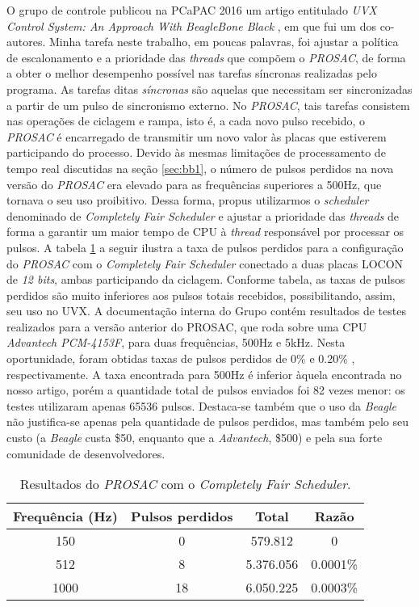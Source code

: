 O grupo de controle publicou na PCaPAC 2016 um artigo entitulado \textit{UVX
Control System: An Approach With BeagleBone Black} \cite{pcapac2016}, em que fui
um dos co-autores. Minha tarefa neste trabalho, em poucas palavras, foi ajustar
a política de escalonamento e a prioridade das \textit{threads} que compõem o
\textit{PROSAC}, de forma a obter o melhor desempenho possível nas tarefas
síncronas realizadas pelo programa. As tarefas ditas \textit{síncronas}
são aquelas que necessitam ser sincronizadas a partir de um pulso de sincronismo
externo. No \textit{PROSAC}, tais tarefas consistem nas operações de ciclagem e
rampa, isto é, a cada novo pulso recebido, o \textit{PROSAC} é encarregado de
transmitir um novo valor às placas que estiverem participando do processo.
Devido às mesmas limitações de processamento de tempo real discutidas na seção
\ref{sec:bb1}, o número de pulsos perdidos na nova versão do \textit{PROSAC} era
elevado para as frequências superiores a 500Hz, que tornava o seu uso
proibitivo. Dessa forma, propus utilizarmos o \textit{scheduler} denominado de
\textit{Completely Fair Scheduler} e ajustar a prioridade das \textit{threads}
de forma a garantir um maior tempo de CPU à \textit{thread} responsável por
processar os pulsos. A tabela \ref{tab:prosac} a seguir ilustra a taxa de pulsos
perdidos para a configuração do \textit{PROSAC} com o \textit{Completely Fair
Scheduler} conectado a duas placas LOCON de \textit{12 bits}, ambas
participando da ciclagem. Conforme tabela, as taxas de pulsos perdidos são muito
inferiores aos pulsos totais recebidos, possibilitando, assim, seu uso no UVX.
A documentação interna do Grupo contém resultados de testes realizados para a
versão anterior do PROSAC, que roda sobre uma CPU \textit{Advantech PCM-4153F}, para
duas frequências, 500Hz e 5kHz. Nesta oportunidade, foram obtidas
taxas de pulsos perdidos de 0\% e 0.20\% \cite{martins}, respectivamente. A taxa
encontrada para 500Hz é inferior àquela encontrada no nosso artigo, porém a
quantidade total de pulsos enviados foi 82 vezes menor: os testes utilizaram
apenas 65536 pulsos. Destaca-se também que o uso da \textit{Beagle} não
justifica-se apenas pela quantidade de pulsos perdidos, mas também pelo seu
custo (a \textit{Beagle} custa \$50, enquanto que a \textit{Advantech}, \$500) e pela sua
forte comunidade de desenvolvedores.

\begin{table}[h]

	\centering
	\caption{\label{tab:prosac} Resultados do \textit{PROSAC} com o
	\textit{Completely Fair Scheduler}.}
	\begin{tabular}{| c | c | c | c |}
		\hline
		\textbf{Frequência (Hz)} & \textbf{Pulsos perdidos} & \textbf{Total} &
		\textbf{Razão} \\ \hline 
		150 & 0 & 579.812  & 0 \\ \hline
		512 & 8 & 5.376.056 & 0.0001\% \\ \hline
		1000 & 18 & 6.050.225 & 0.0003\% \\ \hline
	\end{tabular}	    
\end{table}
 
